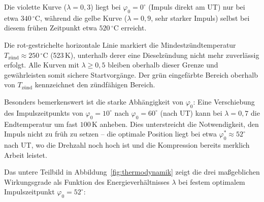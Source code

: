 ﻿\documentclass[a4paper,12pt]{article}
\begin{document}
Die violette Kurve ($\lambda = 0{,}3$) liegt bei $\varphi_0 = 0^\circ$
(Impuls direkt am UT) nur bei etwa $340\,^\circ\text{C}$, während die
gelbe Kurve ($\lambda = 0{,}9$, sehr starker Impuls) selbst bei diesem
frühen Zeitpunkt etwa $520\,^\circ\text{C}$ erreicht.

Die rot-gestrichelte horizontale Linie markiert die Mindestzündtemperatur
$T_\text{zünd} \approx 250\,^\circ\text{C}$ (523\,K), unterhalb derer
eine Dieselzündung nicht mehr zuverlässig erfolgt. Alle Kurven mit
$\lambda \geq 0{,}5$ bleiben oberhalb dieser Grenze und gewährleisten
somit sichere Startvorgänge. Der grün eingefärbte Bereich oberhalb von
$T_\text{zünd}$ kennzeichnet den zündfähigen Bereich.

Besonders bemerkenswert ist die starke Abhängigkeit von $\varphi_0$:
Eine Verschiebung des Impulszeitpunkts von $\varphi_0 = 10^\circ$ nach
$\varphi_0 = 60^\circ$ (nach UT) kann bei $\lambda = 0{,}7$ die Endtemperatur
um fast $100\,\text{K}$ anheben. Dies unterstreicht die Notwendigkeit,
den Impuls nicht zu früh zu setzen -- die optimale Position liegt bei
etwa $\varphi_0^* \approx 52^\circ$ nach UT, wo die Drehzahl noch hoch ist
und die Kompression bereits merklich Arbeit leistet.

Das untere Teilbild in Abbildung~\ref{fig:thermodynamik} zeigt die drei
maßgeblichen Wirkungsgrade als Funktion des Energieverhältnisses $\lambda$
bei festem optimalem Impulszeitpunkt $\varphi_0 = 52^\circ$:
\end{document}
